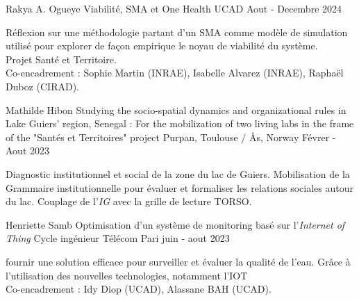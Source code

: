 \begin{cventries}
    \cventry
        {Rakya A. Ogueye} %
        {Viabilité, SMA et One Health} %
        {UCAD } %
        {Aout - Decembre 2024} %
        {
        \begin{cvitems} %
            Réflexion sur une méthodologie partant d’un SMA comme modèle de simulation utilisé pour explorer de façon empirique le noyau de viabilité du système.\\
            Projet Santé et Territoire.\\
            Co-encadrement : Sophie Martin (INRAE), Isabelle Alvarez (INRAE), Raphaël Duboz (CIRAD).
        \end{cvitems}
        }


    \cventry
        {Mathilde Hibon} %
        {Studying the socio-spatial dynamics and organizational rules in Lake Guiers' region, Senegal : For the mobilization of two living labs in the frame of the "Santés et Territoires" project} %
        {Purpan, Toulouse /  Ås, Norway} %
        {Févrer - Aout 2023} %
        {
        \begin{cvitems} %
          Diagnostic institutionnel et social de la zone du lac de Guiers. Mobilisation de la Grammaire institutionnelle pour évaluer et formaliser les relations sociales autour du lac. Couplage de l'\textit{IG} avec la grille de lecture TORSO. 
        \end{cvitems}
        }


    \cventry
        {Henriette Samb} %
        {Optimisation d’un système de monitoring basé sur l’\textit{Internet of Thing}} %
        {Cycle ingénieur Télécom Pari } %
        {juin - aout 2023} %
        {
        \begin{cvitems} %
          fournir une solution efficace pour surveiller et évaluer la qualité de l’eau. Grâce à l’utilisation des nouvelles technologies, notamment l’IOT\\
            Co-encadrement : Idy Diop (UCAD), Alassane BAH (UCAD).
        \end{cvitems}
        }



\end{cventries}
